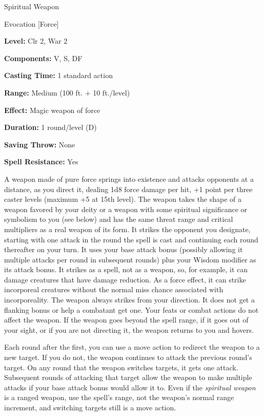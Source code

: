 \documentclass{article}
\begin{document}
\vspace{12pt}
Spiritual Weapon

Evocation [Force]

\textbf{Level:} Clr 2, War 2

\textbf{Components:} V, S, DF

\textbf{Casting Time:} 1 standard action

\textbf{Range: }Medium (100 ft. + 10 ft./level)

\textbf{Effect: }Magic weapon of force

\textbf{Duration:} 1 round/level (D)

\textbf{Saving Throw:} None

\textbf{Spell Resistance:} Yes

A weapon made of pure force springs into existence and attacks opponents at a distance, 
as you direct it, dealing 1d8 force damage per hit, +1 point per three caster levels 
(maximum +5 at 15th level). The weapon takes the shape of a weapon favored by your 
deity or a weapon with some spiritual significance or symbolism to you (see below) 
and has the same threat range and critical multipliers as a real weapon of its 
form. It strikes the opponent you designate, starting with one attack in the round 
the spell is cast and continuing each round thereafter on your turn. It uses your 
base attack bonus (possibly allowing it multiple attacks per round in subsequent 
rounds) plus your Wisdom modifier as its attack bonus. It strikes as a spell, not 
as a weapon, so, for example, it can damage creatures that have damage reduction. 
As a force effect, it can strike incorporeal creatures without the normal miss 
chance associated with incorporeality. The weapon always strikes from your direction. 
It does not get a flanking bonus or help a combatant get one. Your feats or combat 
actions do not affect the weapon. If the weapon goes beyond the spell range, if 
it goes out of your sight, or if you are not directing it, the weapon returns to 
you and hovers.

Each round after the first, you can use a move action to redirect the weapon to 
a new target. If you do not, the weapon continues to attack the previous round's 
target. On any round that the weapon switches targets, it gets one attack. Subsequent 
rounds of attacking that target allow the weapon to make multiple attacks if your 
base attack bonus would allow it to. Even if the \textit{spiritual weapon }is a 
ranged weapon, use the spell's range, not the weapon's normal range increment, 
and switching targets still is a move action.
\end{document}
